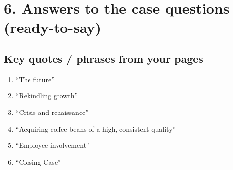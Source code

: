 \documentclass[10pt,a4paper]{article}
\begin{document}
\section*{\color{eublue}6. Answers to the case questions (ready-to-say)}

\subsection*{\color{eublue}Key quotes / phrases from your pages}
\begin{enumerate}
  \item ``The future''
  \item ``Rekindling growth''
  \item ``Crisis and renaissance''
  \item ``Acquiring coffee beans of a high, consistent quality''
  \item ``Employee involvement''
  \item ``Closing Case''
\end{enumerate}
\end{document}

